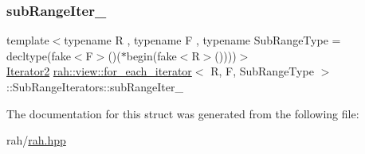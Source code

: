 \mbox{\label{structrah_1_1view_1_1for__each__iterator_1_1_sub_range_iterators_a0f76c77cd0217895523efc6e30ad08f4}} 
\subsubsection{\texorpdfstring{subRangeIter\_}{subRangeIter\_}}
{\footnotesize\ttfamily template$<$typename R , typename F , typename Sub\+Range\+Type  = decltype(fake$<$\+F$>$()($\ast$begin(fake$<$\+R$>$())))$>$ \\
\mbox{\hyperlink{structrah_1_1view_1_1for__each__iterator_a13108a8db132a8157375f81cf9b12ce1}{Iterator2}} \mbox{\hyperlink{structrah_1_1view_1_1for__each__iterator}{rah\+::view\+::for\+\_\+each\+\_\+iterator}}$<$ R, F, Sub\+Range\+Type $>$\+::Sub\+Range\+Iterators\+::sub\+Range\+Iter\+\_\+}



The documentation for this struct was generated from the following file\+:\begin{DoxyCompactItemize}
\item 
rah/\mbox{\hyperlink{rah_8hpp}{rah.\+hpp}}\end{DoxyCompactItemize}
